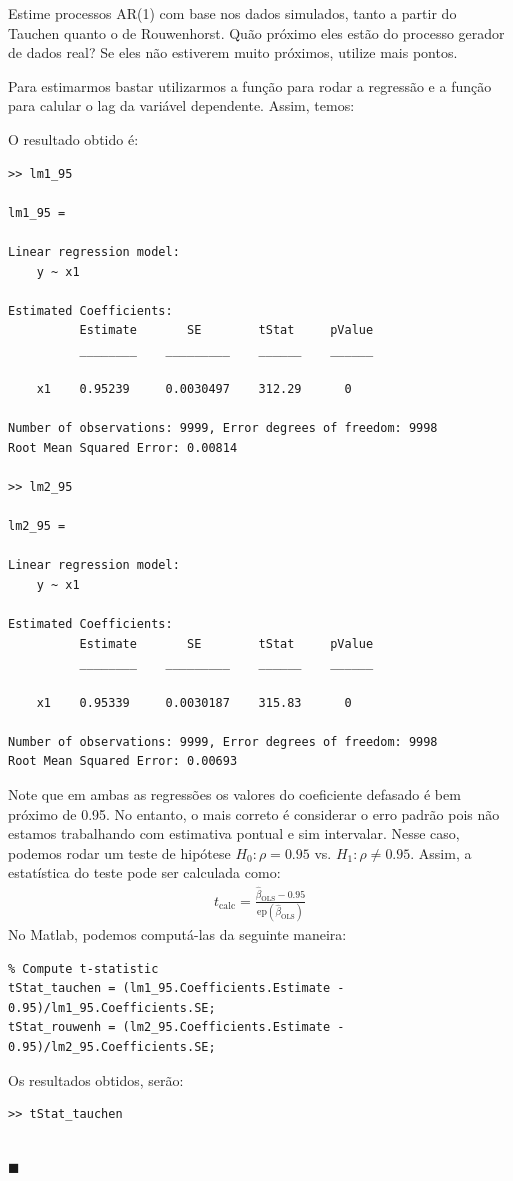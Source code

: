 \documentclass[10pt]{article}
\newcommand*{\QEDA}{\hfill\ensuremath{\blacksquare}}%
\newcommand\0{\mathbf{0}}
\newenvironment{sol}
    {\\[1em] {\color{magenta}\text{Resposta.}}
    }
    {{\color{blue!50!black}\QEDA}}
\begin{document}
Estime processos AR(1) com base nos dados simulados, tanto a partir
do Tauchen quanto o de Rouwenhorst. Quão próximo eles estão do
processo gerador de dados real? Se eles não estiverem muito próximos,
utilize mais pontos.
\begin{sol}
Para estimarmos bastar utilizarmos a função  para rodar a regressão e a função  para calular o lag da variável dependente. Assim, temos: \vspace{-0.2cm} 

O resultado obtido é: \vspace{-0.2cm}
\begin{lstlisting}
>> lm1_95

lm1_95 = 

Linear regression model:
    y ~ x1

Estimated Coefficients:
          Estimate       SE        tStat     pValue
          ________    _________    ______    ______

    x1    0.95239     0.0030497    312.29      0   

Number of observations: 9999, Error degrees of freedom: 9998
Root Mean Squared Error: 0.00814

>> lm2_95

lm2_95 = 

Linear regression model:
    y ~ x1

Estimated Coefficients:
          Estimate       SE        tStat     pValue
          ________    _________    ______    ______

    x1    0.95339     0.0030187    315.83      0   

Number of observations: 9999, Error degrees of freedom: 9998
Root Mean Squared Error: 0.00693
\end{lstlisting}
Note que em ambas as regressões os valores do coeficiente defasado é bem próximo de 0.95. No entanto, o mais correto é considerar o erro padrão pois não estamos trabalhando com estimativa pontual e sim intervalar. Nesse caso, podemos rodar um teste de hipótese $H_0: \rho = 0.95$ vs. $H_1: \rho \neq 0.95$. Assim, a estatística do teste pode ser calculada como: 
\begin{align*}
t_{\text{calc}} = \frac{\hat{\beta}_{\text{OLS}} - 0.95}{\text{ep}(\hat{\beta}_{\text{OLS}})}
\end{align*}
No Matlab, podemos computá-las da seguinte maneira:
\begin{lstlisting}
% Compute t-statistic
tStat_tauchen = (lm1_95.Coefficients.Estimate - 0.95)/lm1_95.Coefficients.SE;
tStat_rouwenh = (lm2_95.Coefficients.Estimate - 0.95)/lm2_95.Coefficients.SE;
\end{lstlisting}
Os resultados obtidos, serão:
\begin{lstlisting}
>> tStat_tauchen


\end{lstlisting}
\end{sol}
\end{document}

